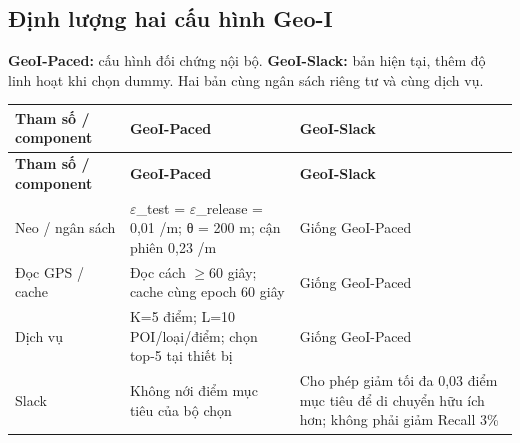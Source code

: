 \subsection{Định lượng hai cấu hình Geo-I}
\textbf{GeoI-Paced:} cấu hình đối chứng nội bộ. \textbf{GeoI-Slack:} bản hiện tại, thêm độ linh hoạt khi chọn dummy. Hai bản cùng ngân sách riêng tư và cùng dịch vụ.

\begingroup\small
\begin{longtable}{@{}P{3.938cm}P{6.350cm}P{6.350cm}@{}}
\toprule
\textbf{Tham số / component} & \textbf{GeoI-Paced} & \textbf{GeoI-Slack}\\\midrule
\endfirsthead
\toprule
\textbf{Tham số / component} & \textbf{GeoI-Paced} & \textbf{GeoI-Slack}\\\midrule
\endhead
\bottomrule\endfoot
Neo / ngân sách & $\varepsilon$\_\allowbreak{}test = $\varepsilon$\_\allowbreak{}release = 0,01 /m; θ = 200 m; cận phiên 0,23 /m & Giống GeoI-Paced\\
\addlinespace[3pt]
Đọc GPS / cache & Đọc cách $\ge$60 giây; cache cùng epoch 60 giây & Giống GeoI-Paced\\
\addlinespace[3pt]
Dịch vụ & K=5 điểm; L=10 POI/loại/điểm; chọn top-5 tại thiết bị & Giống GeoI-Paced\\
\addlinespace[3pt]
Slack & Không nới điểm mục tiêu của bộ chọn & Cho phép giảm tối đa 0,03 điểm mục tiêu để di chuyển hữu ích hơn; không phải giảm Recall 3\%\\
\end{longtable}
\endgroup
{}

